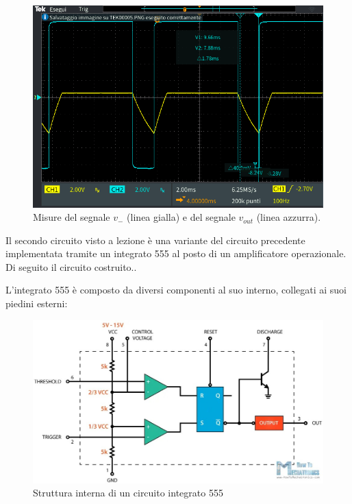 \begin{figure}[h!]
	\centering
	\includegraphics[width=\linewidth]{./ImageFiles/Laboratorio 4/TEK00006.PNG}
	\caption{Misure del segnale $v_{-}$ (linea gialla) e del segnale $v_{out}$ (linea azzurra).}
	\label{fig:calcolo_ta}
\end{figure}

\newpage
Il secondo circuito visto a lezione è una variante del circuito precedente implementata tramite un integrato 555 al posto di un amplificatore operazionale. Di seguito il circuito costruito..

L'integrato 555 è composto da diversi componenti al suo interno, collegati ai suoi piedini esterni:
\begin{figure}[ht!]
	\centering
	\includegraphics[width=\linewidth]{./ImageFiles/Laboratorio 4/555internals.jpg}
	\caption{Struttura interna di un circuito integrato 555}
	\label{fig:555_internals}
\end{figure}

